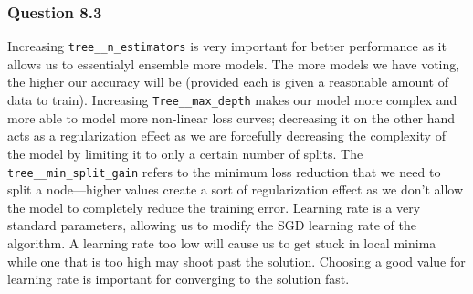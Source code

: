 \documentclass[11pt,letterpaper]{article}
\begin{document}
\subsubsection*{Question 8.3}
Increasing \texttt{tree__n_estimators} is very important for better performance as it 
allows us to essentialyl ensemble more models. The more models we have voting, the higher 
our accuracy will be (provided each is given a reasonable amount of data to train). 
Increasing \texttt{Tree__max_depth} makes our model more complex and more able to model 
more non-linear loss curves; decreasing it on the other hand acts as a regularization effect as we 
are forcefully decreasing the complexity of the model by limiting it to only a certain number of 
splits. The \texttt{tree__min_split_gain} refers to the minimum loss reduction that we need to 
split a node—higher values create a sort of regularization effect as we don't allow the model to 
completely reduce the training error. Learning rate is a very standard parameters, allowing us to modify 
the SGD learning rate of the algorithm. A learning rate too low will cause us to get stuck in local 
minima while one that is too high may shoot past the solution. Choosing a good value for learning rate is 
important for converging to the solution fast. 



\end{document}
